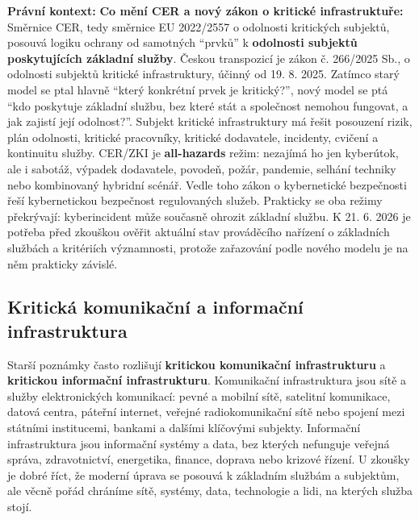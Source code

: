 \documentclass[11pt,a4paper]{article}
\newcommand{\pravobox}[1]{\begin{tcolorbox}[breakable,enhanced,colback=yellow!18,colframe=yellow!45!black,boxrule=0pt,arc=1mm,left=5pt,right=5pt,top=5pt,bottom=5pt,before skip=6pt,after skip=6pt]\textbf{Právní kontext:} #1\end{tcolorbox}}
\begin{document}
\pravobox{\textbf{Co mění CER a nový zákon o kritické infrastruktuře:} Směrnice CER, tedy směrnice EU 2022/2557 o odolnosti kritických subjektů, posouvá logiku ochrany od samotných “prvků” k \textbf{odolnosti subjektů poskytujících základní služby}. Českou transpozicí je zákon č. 266/2025 Sb., o odolnosti subjektů kritické infrastruktury, účinný od 19. 8. 2025. Zatímco starý model se ptal hlavně “který konkrétní prvek je kritický?”, nový model se ptá “kdo poskytuje základní službu, bez které stát a společnost nemohou fungovat, a jak zajistí její odolnost?”. Subjekt kritické infrastruktury má řešit posouzení rizik, plán odolnosti, kritické pracovníky, kritické dodavatele, incidenty, cvičení a kontinuitu služby. CER/ZKI je \textbf{all-hazards} režim: nezajímá ho jen kyberútok, ale i sabotáž, výpadek dodavatele, povodeň, požár, pandemie, selhání techniky nebo kombinovaný hybridní scénář. Vedle toho zákon o kybernetické bezpečnosti řeší kybernetickou bezpečnost regulovaných služeb. Prakticky se oba režimy překrývají: kyberincident může současně ohrozit základní službu. K 21. 6. 2026 je potřeba před zkouškou ověřit aktuální stav prováděcího nařízení o základních službách a kritériích významnosti, protože zařazování podle nového modelu je na něm prakticky závislé.}

\subsection*{Kritická komunikační a informační infrastruktura}
Starší poznámky často rozlišují \textbf{kritickou komunikační infrastrukturu} a \textbf{kritickou informační infrastrukturu}. Komunikační infrastruktura jsou sítě a služby elektronických komunikací: pevné a mobilní sítě, satelitní komunikace, datová centra, páteřní internet, veřejné radiokomunikační sítě nebo spojení mezi státními institucemi, bankami a dalšími klíčovými subjekty. Informační infrastruktura jsou informační systémy a data, bez kterých nefunguje veřejná správa, zdravotnictví, energetika, finance, doprava nebo krizové řízení. U zkoušky je dobré říct, že moderní úprava se posouvá k základním službám a subjektům, ale věcně pořád chráníme sítě, systémy, data, technologie a lidi, na kterých služba stojí.
\end{document}
